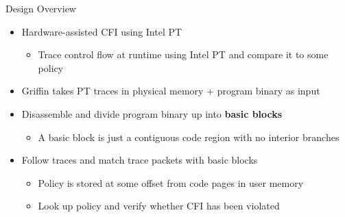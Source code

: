 \documentclass[12pt, dvipsnames, aspectratio=169]{beamer}
\begin{document}
\begin{frame}[c]{Design Overview}{}
  \begin{itemize}
    \item Hardware-assisted CFI using Intel PT
    \begin{itemize}
      \item Trace control flow at runtime using Intel PT and compare it to some policy
    \end{itemize}
  \end{itemize}

  \vfill
  \begin{itemize}
    \item Griffin takes PT traces in physical memory + program binary as input
  \end{itemize}

  \vfill
  \begin{itemize}
    \item Disassemble and divide program binary up into {\bf basic blocks}
    \begin{itemize}
      \item A basic block is just a contiguous code region with no interior branches
    \end{itemize}
  \end{itemize}

  \vfill
  \begin{itemize}
    \item Follow traces and match trace packets with basic blocks
    \begin{itemize}
      \item Policy is stored at some offset from code pages in user memory
      \item Look up policy and verify whether CFI has been violated
    \end{itemize}
  \end{itemize}
\end{frame}
\end{document}
